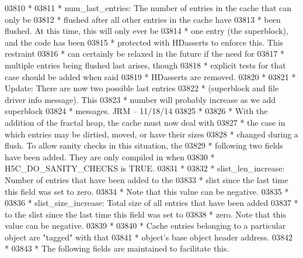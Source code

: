 \begin{DoxyCode}
03810 \textcolor{comment}{ *}
03811 \textcolor{comment}{ * num\_last\_entries: The number of entries in the cache that can only be}
03812 \textcolor{comment}{ *      flushed after all other entries in the cache have}
03813 \textcolor{comment}{ *              been flushed. At this time, this will only ever be}
03814 \textcolor{comment}{ *              one entry (the superblock), and the code has been}
03815 \textcolor{comment}{ *              protected with HDasserts to enforce this. This restraint}
03816 \textcolor{comment}{ *              can certainly be relaxed in the future if the need for}
03817 \textcolor{comment}{ *              multiple entries being flushed last arises, though}
03818 \textcolor{comment}{ *              explicit tests for that case should be added when said}
03819 \textcolor{comment}{ *              HDasserts are removed.}
03820 \textcolor{comment}{ *}
03821 \textcolor{comment}{ *      Update: There are now two possible last entries}
03822 \textcolor{comment}{ *      (superblock and file driver info message).  This}
03823 \textcolor{comment}{ *      number will probably increase as we add superblock}
03824 \textcolor{comment}{ *      messages.   JRM -- 11/18/14}
03825 \textcolor{comment}{ *}
03826 \textcolor{comment}{ * With the addition of the fractal heap, the cache must now deal with}
03827 \textcolor{comment}{ * the case in which entries may be dirtied, moved, or have their sizes}
03828 \textcolor{comment}{ * changed during a flush.  To allow sanity checks in this situation, the}
03829 \textcolor{comment}{ * following two fields have been added.  They are only compiled in when}
03830 \textcolor{comment}{ * H5C\_DO\_SANITY\_CHECKS is TRUE.}
03831 \textcolor{comment}{ *}
03832 \textcolor{comment}{ * slist\_len\_increase: Number of entries that have been added to the}
03833 \textcolor{comment}{ *      slist since the last time this field was set to zero.}
03834 \textcolor{comment}{ *      Note that this value can be negative.}
03835 \textcolor{comment}{ *}
03836 \textcolor{comment}{ * slist\_size\_increase: Total size of all entries that have been added}
03837 \textcolor{comment}{ *      to the slist since the last time this field was set to}
03838 \textcolor{comment}{ *      zero.  Note that this value can be negative.}
03839 \textcolor{comment}{ *}
03840 \textcolor{comment}{ * Cache entries belonging to a particular object are "tagged" with that}
03841 \textcolor{comment}{ * object's base object header address.}
03842 \textcolor{comment}{ *}
03843 \textcolor{comment}{ * The following fields are maintained to facilitate this.}

\end{DoxyCode}
